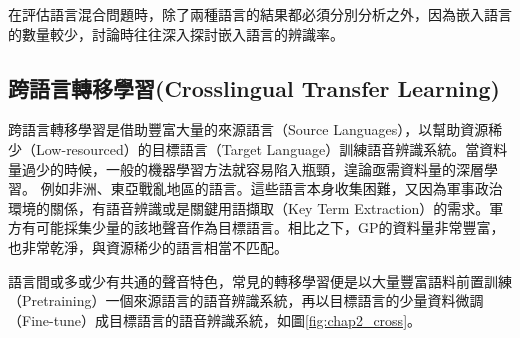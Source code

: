 在評估語言混合問題時，除了兩種語言的結果都必須分別分析之外，因為嵌入語言的數量較少，討論時往往深入探討嵌入語言的辨識率。


\subsection{跨語言轉移學習(Crosslingual Transfer Learning)}
跨語言轉移學習是借助豐富大量的來源語言（Source Languages），以幫助資源稀少（Low-resourced）的目標語言（Target Language）訓練語音辨識系統。當資料量過少的時候，一般的機器學習方法就容易陷入瓶頸，遑論亟需資料量的深層學習。
例如非洲、東亞戰亂地區的語言。這些語言本身收集困難，又因為軍事政治環境的關係，有語音辨識或是關鍵用語擷取（Key Term Extraction）的需求。軍方有可能採集少量的該地聲音作為目標語言。相比之下，GP的資料量非常豐富，也非常乾淨，與資源稀少的語言相當不匹配。

語言間或多或少有共通的聲音特色，常見的轉移學習便是以大量豐富語料前置訓練（Pretraining）一個來源語言的語音辨識系統\cite{huang2013cross}，再以目標語言的少量資料微調（Fine-tune）成目標語言的語音辨識系統，如圖\ref{fig:chap2_cross}。

